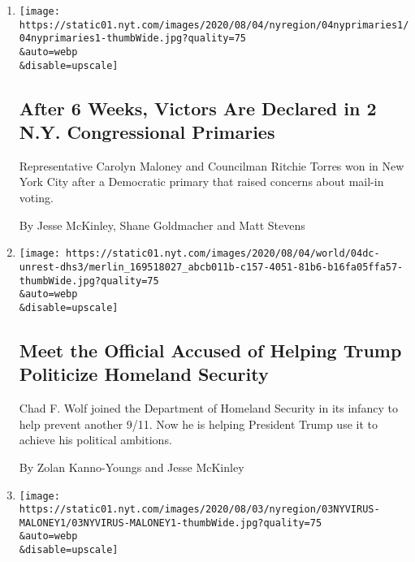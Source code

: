 \begin{enumerate}
\def\labelenumi{\arabic{enumi}.}
\item
  \href{/2020/08/04/nyregion/maloney-torres-ny-congressional-races.html}{}

  \texttt{[image: https://static01.nyt.com/images/2020/08/04/nyregion/04nyprimaries1/04nyprimaries1-thumbWide.jpg?quality=75\\\&auto=webp\\\&disable=upscale]}

  \hypertarget{after-6-weeks-victors-are-declared-in-2-ny-congressional-primaries}{%
  \subsection{After 6 Weeks, Victors Are Declared in 2 N.Y.
  Congressional
  Primaries}\label{after-6-weeks-victors-are-declared-in-2-ny-congressional-primaries}}

  Representative Carolyn Maloney and Councilman Ritchie Torres won in
  New York City after a Democratic primary that raised concerns about
  mail-in voting.

  By Jesse McKinley, Shane Goldmacher and Matt Stevens
\item
  \href{/2020/08/04/us/politics/trump-homeland-security.html}{}

  \texttt{[image: https://static01.nyt.com/images/2020/08/04/world/04dc-unrest-dhs3/merlin\_169518027\_abcb011b-c157-4051-81b6-b16fa05ffa57-thumbWide.jpg?quality=75\\\&auto=webp\\\&disable=upscale]}

  \hypertarget{meet-the-official-accused-of-helping-trump-politicize-homeland-security}{%
  \subsection{Meet the Official Accused of Helping Trump Politicize
  Homeland
  Security}\label{meet-the-official-accused-of-helping-trump-politicize-homeland-security}}

  Chad F. Wolf joined the Department of Homeland Security in its infancy
  to help prevent another 9/11. Now he is helping President Trump use it
  to achieve his political ambitions.

  By Zolan Kanno-Youngs and Jesse McKinley
\item
  \href{/2020/08/03/nyregion/nyc-congress-carolyn-maloney-ballots.html}{}

  \texttt{[image: https://static01.nyt.com/images/2020/08/03/nyregion/03NYVIRUS-MALONEY1/03NYVIRUS-MALONEY1-thumbWide.jpg?quality=75\\\&auto=webp\\\&disable=upscale]}


\end{enumerate}
